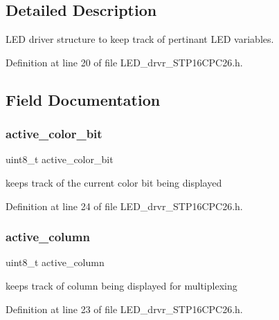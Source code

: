 \subsection{Detailed Description}
L\+ED driver structure to keep track of pertinant L\+ED variables. 

Definition at line 20 of file L\+E\+D\+\_\+drvr\+\_\+\+S\+T\+P16\+C\+P\+C26.\+h.



\subsection{Field Documentation}
\hypertarget{struct_l_e_d__drvr__t_a36030c0b3d311ba697fb3e70ad7680a2}{}\label{struct_l_e_d__drvr__t_a36030c0b3d311ba697fb3e70ad7680a2} 
\subsubsection{\texorpdfstring{active\+\_\+color\+\_\+bit}{active\_color\_bit}}
{\footnotesize\ttfamily uint8\+\_\+t active\+\_\+color\+\_\+bit}



keeps track of the current color bit being displayed 



Definition at line 24 of file L\+E\+D\+\_\+drvr\+\_\+\+S\+T\+P16\+C\+P\+C26.\+h.

\hypertarget{struct_l_e_d__drvr__t_a736bd2bd907652812bf3a1f3d20eb9ae}{}\label{struct_l_e_d__drvr__t_a736bd2bd907652812bf3a1f3d20eb9ae} 
\subsubsection{\texorpdfstring{active\+\_\+column}{active\_column}}
{\footnotesize\ttfamily uint8\+\_\+t active\+\_\+column}



keeps track of column being displayed for multiplexing 



Definition at line 23 of file L\+E\+D\+\_\+drvr\+\_\+\+S\+T\+P16\+C\+P\+C26.\+h.

